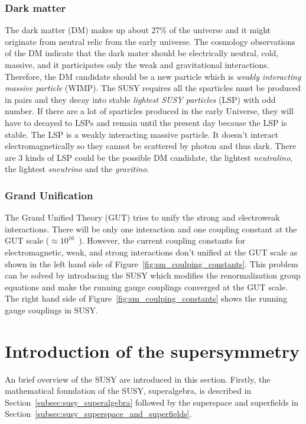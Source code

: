
\subsubsection{Dark matter}
\label{subsubsec:susy_dark_matter}
The dark matter (DM) makes up about 27\% of the universe and it might originate from neutral relic from the early universe.
The cosmology observations of the DM indicate that the dark mater should be electrically neutral, cold, massive, and it participates only the weak and gravitational interactions.
Therefore, the DM candidate should be a new particle which is \textit{weakly interacting massive particle} (WIMP).
The SUSY requires all the sparticles must be produced in pairs and they decay into stable \textit{lightest SUSY particles} (LSP) with odd number.
If there are a lot of sparticles produced in the early Universe, they will have to decayed to LSPs and remain until the present day because the LSP is stable.
The LSP is a weakly interacting massive particle.
It doesn't interact electromagnetically so they cannot be scattered by photon and thus dark.
There are 3 kinds of LSP could be the possible DM candidate, the lightest \textit{neutralino}, the lightest \textit{sneutrino} and the \textit{gravitino}.


\subsubsection{Grand Unification}
\label{subsubsec:susy_gut}
The Grand Unified Theory (GUT) tries to unify the strong and electroweak interactions.
There will be only one interaction and one coupling constant at the GUT scale ($\approx 10^{16}$~{\GeV}).
However, the current coupling constants for electromagnetic, weak, and strong interactions don't unified at the GUT scale as shown in the left hand side of Figure~\ref{fig:sm_coulping_constants}.
This problem can be solved by introducing the SUSY which modifies the renormalization group equations and make the running gauge couplings converged at the GUT scale.
The right hand side of Figure~\ref{fig:sm_coulping_constants} shows the running gauge couplings in SUSY.


\section{Introduction of the supersymmetry}
\label{sec:susy_intro}
An brief overview of the SUSY are introduced in this section.
Firstly, the mathematical foundation of the SUSY, superalgebra, is described in Section~\ref{subsec:susy_superalgebra} followed by the superspace and superfields in Section~\ref{subsec:susy_superspace_and_superfields}.

